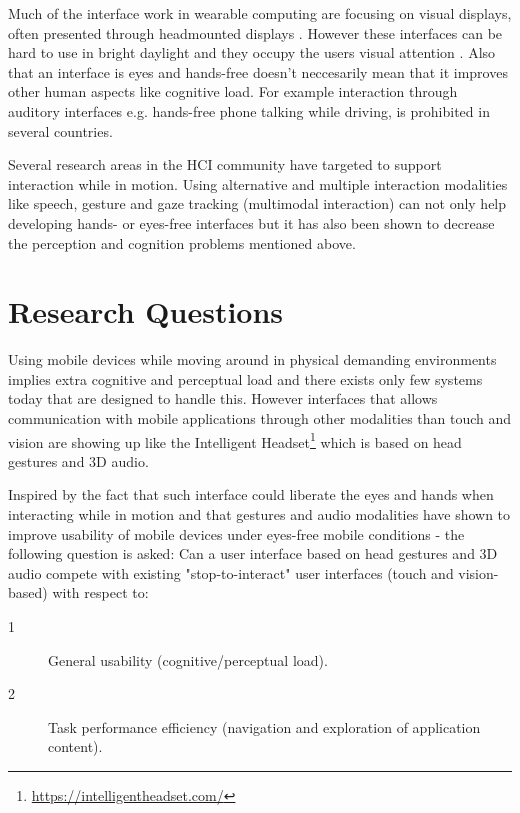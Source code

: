 Much of the interface work in wearable computing are focusing on visual displays, often presented through headmounted displays \cite{barfield_fundamentals_2000}. However these interfaces can be hard to use in bright daylight and they occupy the users visual attention \cite{geelhoed_safety_2000}. Also that an interface is eyes and hands-free doesn't neccesarily mean that it improves other human aspects like cognitive load. For example interaction through auditory interfaces e.g. hands-free phone talking while driving, is prohibited in several countries.

Several research areas in the HCI community have targeted to support interaction while in motion. Using alternative and multiple interaction modalities like speech, gesture and gaze tracking (multimodal interaction) can not only help developing hands- or eyes-free interfaces but it has also been shown to decrease the perception and cognition problems mentioned above.

\newpage

\section{Research Questions}
\label{sec:researchquestions}
Using mobile devices while moving around in physical demanding environments implies extra cognitive and perceptual load and there exists only few systems today that are designed to handle this. However interfaces that allows communication with mobile applications through other modalities than touch and vision are showing up like the Intelligent Headset\footnote{\url{https://intelligentheadset.com/}} which is based on head gestures and 3D audio.

Inspired by the fact that such interface could liberate the eyes and hands when interacting while in motion and that gestures and audio modalities have shown to improve usability of mobile devices under eyes-free mobile conditions \cite{brewster_multimodaleyes-freeinteraction_2003} - the following question is asked: Can a user interface based on head gestures and 3D audio compete with existing "stop-to-interact" user interfaces (touch and vision-based) with respect to:

\begin{description}
\item[1] General usability (cognitive/perceptual load).
\item[2] Task performance efficiency (navigation and exploration of application content).
\end{description}


